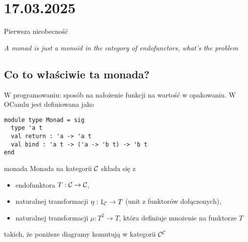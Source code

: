 \section{17.03.2025}{Pierwsza nieobecność}

\begin{adjustwidth}{200pt}{0pt}
\begin{flushright}\slshape
  A monad is just a monoid in the category of endofunctors, what's the problem
\end{flushright}
\end{adjustwidth}

\subsection{Co to właściwie ta monada?}

W programowaniu: sposób na nałożenie funkcji na wartość w opakowaniu. W OCamlu jest definiowana jako

\begin{lstlisting}[language=caml]
module type Monad = sig
  type 'a t
  val return : 'a -> 'a t
  val bind : 'a t -> ('a -> 'b t) -> 'b t
end
\end{lstlisting}

\begin{definition}{monada}{}
  Monada na kategorii $\mathcal{C}$ składa się z
  \begin{itemize}
    \item endofunktora $T:\mathcal{C}\to\mathcal{C}$,
    \item naturalnej transformacji $\eta:1_{\mathcal{C}}\to T$ (unit z funktorów dołączonych),
    \item naturalnej transformacji $\mu:T^2\to T$, która definiuje mnożenie na funktorze $T$
  \end{itemize}
  takich, że poniższe diagramy komutują w kategorii $\mathcal{C}^{\mathcal{C}}$
  \begin{center}
  \end{center}
\end{definition}

